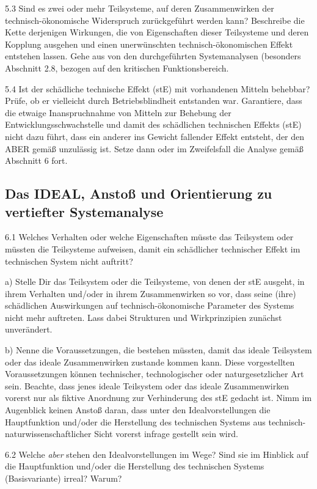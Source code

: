 \documentclass[12pt,a4paper]{article}
\begin{document}
5.3 Sind es zwei oder mehr Teilsysteme, auf deren Zusammenwirken der
technisch-ökonomische Widerspruch zurückgeführt werden kann? Beschreibe die
Kette derjenigen Wirkungen, die von Eigenschaften dieser Teilsysteme und deren
Kopplung ausgehen und einen unerwünschten technisch-ökonomischen Effekt
entstehen lassen. Gehe aus von den durchgeführten Systemanalysen (besonders
Abschnitt 2.8, bezogen auf den kritischen Funktionsbereich.

5.4 Ist der schädliche technische Effekt (stE) mit vorhandenen Mitteln
behebbar? Prüfe, ob er vielleicht durch Betriebsblindheit entstanden
war. Garantiere, dass die etwaige Inanspruchnahme von Mitteln zur Behebung der
Entwicklungsschwachstelle und damit des schädlichen technischen Effekts (stE)
nicht dazu führt, dass ein anderer ins Gewicht fallender Effekt entsteht, der
den ABER gemäß unzulässig ist. Setze dann oder im Zweifelsfall die Analyse
gemäß Abschnitt 6 fort.

\subsection{Das IDEAL, Anstoß und Orientierung zu vertiefter Systemanalyse}

6.1 Welches Verhalten oder welche Eigenschaften müsste das Teilsystem oder
müssten die Teilsysteme aufweisen, damit ein schädlicher technischer Effekt im
technischen System nicht auftritt?

a) Stelle Dir das Teilsystem oder die Teilsysteme, von denen der stE ausgeht,
in ihrem Verhalten und/oder in ihrem Zusammenwirken so vor, dass seine (ihre)
schädlichen Auswirkungen auf technisch-ökonomische Parameter des Systems nicht
mehr auftreten. Lass dabei Strukturen und Wirkprinzipien zunächst unverändert.

b) Nenne die Voraussetzungen, die bestehen müssten, damit das ideale Teilsystem
oder das ideale Zusammenwirken zustande kommen kann. Diese vorgestellten
Voraussetzungen können technischer, technologischer oder naturgesetzlicher Art
sein.  Beachte, dass jenes ideale Teilsystem oder das ideale Zusammenwirken
vorerst nur als fiktive Anordnung zur Verhinderung des stE gedacht ist.  Nimm
im Augenblick keinen Anstoß daran, dass unter den Idealvorstellungen die
Hauptfunktion und/oder die Herstellung des technischen Systems aus
technisch-naturwissenschaftlicher Sicht vorerst infrage gestellt sein wird.

6.2 Welche \emph{aber} stehen den Idealvorstellungen im Wege? Sind sie im
Hinblick auf die Hauptfunktion und/oder die Herstellung des technischen Systems
(Basisvariante) irreal? Warum?
\end{document}
